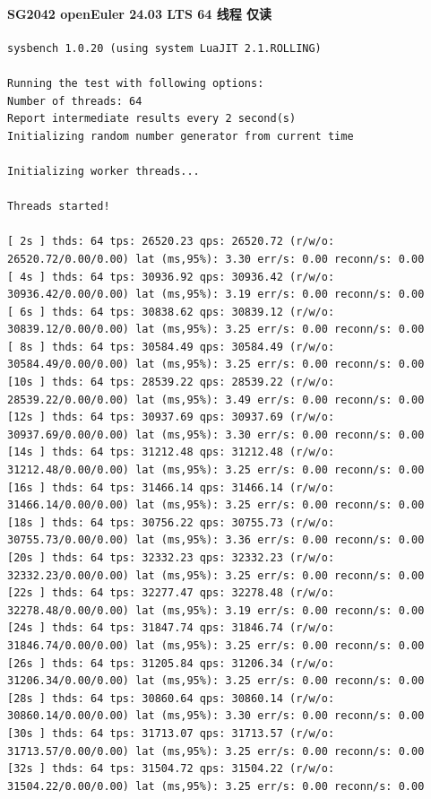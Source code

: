 \documentclass{article}
\begin{document}
\paragraph{SG2042 openEuler 24.03 LTS 64 线程 仅读}

\begin{verbatim}
sysbench 1.0.20 (using system LuaJIT 2.1.ROLLING)

Running the test with following options:
Number of threads: 64
Report intermediate results every 2 second(s)
Initializing random number generator from current time

Initializing worker threads...

Threads started!

[ 2s ] thds: 64 tps: 26520.23 qps: 26520.72 (r/w/o: 26520.72/0.00/0.00) lat (ms,95%): 3.30 err/s: 0.00 reconn/s: 0.00
[ 4s ] thds: 64 tps: 30936.92 qps: 30936.42 (r/w/o: 30936.42/0.00/0.00) lat (ms,95%): 3.19 err/s: 0.00 reconn/s: 0.00
[ 6s ] thds: 64 tps: 30838.62 qps: 30839.12 (r/w/o: 30839.12/0.00/0.00) lat (ms,95%): 3.25 err/s: 0.00 reconn/s: 0.00
[ 8s ] thds: 64 tps: 30584.49 qps: 30584.49 (r/w/o: 30584.49/0.00/0.00) lat (ms,95%): 3.25 err/s: 0.00 reconn/s: 0.00
[10s ] thds: 64 tps: 28539.22 qps: 28539.22 (r/w/o: 28539.22/0.00/0.00) lat (ms,95%): 3.49 err/s: 0.00 reconn/s: 0.00
[12s ] thds: 64 tps: 30937.69 qps: 30937.69 (r/w/o: 30937.69/0.00/0.00) lat (ms,95%): 3.30 err/s: 0.00 reconn/s: 0.00
[14s ] thds: 64 tps: 31212.48 qps: 31212.48 (r/w/o: 31212.48/0.00/0.00) lat (ms,95%): 3.25 err/s: 0.00 reconn/s: 0.00
[16s ] thds: 64 tps: 31466.14 qps: 31466.14 (r/w/o: 31466.14/0.00/0.00) lat (ms,95%): 3.25 err/s: 0.00 reconn/s: 0.00
[18s ] thds: 64 tps: 30756.22 qps: 30755.73 (r/w/o: 30755.73/0.00/0.00) lat (ms,95%): 3.36 err/s: 0.00 reconn/s: 0.00
[20s ] thds: 64 tps: 32332.23 qps: 32332.23 (r/w/o: 32332.23/0.00/0.00) lat (ms,95%): 3.25 err/s: 0.00 reconn/s: 0.00
[22s ] thds: 64 tps: 32277.47 qps: 32278.48 (r/w/o: 32278.48/0.00/0.00) lat (ms,95%): 3.19 err/s: 0.00 reconn/s: 0.00
[24s ] thds: 64 tps: 31847.74 qps: 31846.74 (r/w/o: 31846.74/0.00/0.00) lat (ms,95%): 3.25 err/s: 0.00 reconn/s: 0.00
[26s ] thds: 64 tps: 31205.84 qps: 31206.34 (r/w/o: 31206.34/0.00/0.00) lat (ms,95%): 3.25 err/s: 0.00 reconn/s: 0.00
[28s ] thds: 64 tps: 30860.64 qps: 30860.14 (r/w/o: 30860.14/0.00/0.00) lat (ms,95%): 3.30 err/s: 0.00 reconn/s: 0.00
[30s ] thds: 64 tps: 31713.07 qps: 31713.57 (r/w/o: 31713.57/0.00/0.00) lat (ms,95%): 3.25 err/s: 0.00 reconn/s: 0.00
[32s ] thds: 64 tps: 31504.72 qps: 31504.22 (r/w/o: 31504.22/0.00/0.00) lat (ms,95%): 3.25 err/s: 0.00 reconn/s: 0.00

\end{verbatim}
\end{document}
